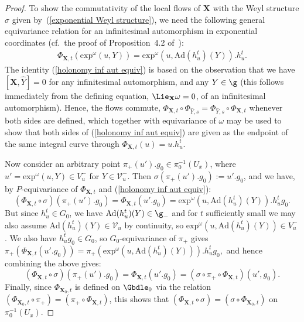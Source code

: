 \begin{proof}
To show the commutativity of the local f\/lows of $\mathbf{X}$ with the Weyl structure $\sigma$ given by~(\ref{exponential Weyl structure}), we need the following general equivariance relation for an inf\/initesimal automorphism in exponential coordinates (cf.\ the proof of Proposition~4.2 of~\cite{Frances3}):
\begin{gather}
\Phi_{\mathbf{X},t}(\mathrm{exp}^{\omega}(u,Y)) = \mathrm{exp}^{\omega}(u,\mathrm{Ad}(h_u^t)(Y)).h_u^t. \label{holonomy inf aut equiv}
\end{gather}
The identity (\ref{holonomy inf aut equiv}) is based on the observation that we have $[\mathbf{X},\hat{Y}] = 0$ for any inf\/initesimal automorphism, and any $Y \in \g$ (this follows immediately from the def\/ining equation, $\Lie_{\mathbf{X}}\omega = 0$, of an inf\/initesimal automorphism). Hence, the f\/lows commute, $\Phi_{\mathbf{X},t} \circ \Phi_{\hat{Y},s} = \Phi_{\hat{Y},s} \circ \Phi_{\mathbf{X},t}$ whenever both sides are def\/ined, which together with equivariance of $\omega$ may be used to show that both sides of (\ref{holonomy inf aut equiv}) are given as the endpoint of the same integral curve through $\Phi_{\mathbf{X},t}(u) = u.h_u^t$.

Now consider an arbitrary point $\pi_+(u').g_0 \in \pi_0^{-1}(U_x)$, where $u' = \mathrm{exp}^{\omega}(u,Y) \in V_u^-$ for $Y \in \mathcal{V}_u^-$. Then $\sigma(\pi_+(u').g_0) := u'.g_0$, and we have, by $P$-equivariance of $\Phi_{\mathbf{X},t}$ and (\ref{holonomy inf aut equiv}):
\[
(\Phi_{\mathbf{X},t} \circ \sigma)(\pi_+(u').g_0) = \Phi_{\mathbf{X},t}(u'.g_0) = \mathrm{exp}^{\omega}(u,\mathrm{Ad}(h_u^t)(Y)).h_u^tg_0.
\]
But since $h_u^t \in G_0$, we have $\mathrm{Ad}(h_u^t)(Y) \in \g_-$ and for $t$ suf\/f\/iciently small we may also assume $\mathrm{Ad}(h_u^t)(Y) \in \mathcal{V}_u$ by continuity, so $\mathrm{exp}^{\omega}(u,\mathrm{Ad}(h_u^t)(Y)) \in V_u^-$. We also have $h_u^tg_0 \in G_0$, so $G_0$-equivariance of $\pi_+$ gives $\pi_+(\Phi_{\mathbf{X},t}(u'.g_0)) = \pi_+(\mathrm{exp}^{\omega}(u,\mathrm{Ad}(h_u^t)(Y))).h_u^tg_0,$ and hence combining the above gives:
\[
(\Phi_{\mathbf{X},t} \circ \sigma)(\pi_+(u').g_0) = \Phi_{\mathbf{X},t}(u'.g_0) = (\sigma \circ \pi_+ \circ \Phi_{\mathbf{X},t})(u',g_0).
\]
Finally, since $\Phi_{\mathbf{X}_0,t}$ is def\/ined on $\Gbdle_0$ via the relation $(\Phi_{\mathbf{X}_0,t} \circ \pi_+) = (\pi_+ \circ \Phi_{\mathbf{X},t})$, this shows that $(\Phi_{\mathbf{X},t} \circ \sigma) = (\sigma \circ \Phi_{\mathbf{X}_0,t})$ on~$\pi_0^{-1}(U_x)$.
\end{proof}

